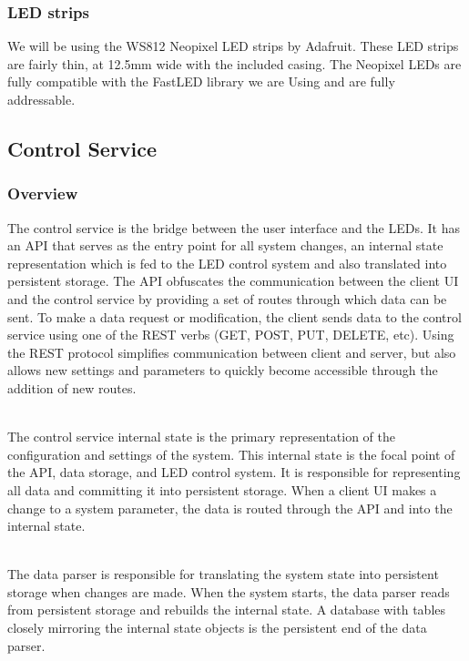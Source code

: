 \documentclass[onecolumn, draftclsnofoot,10pt, compsoc]{IEEEtran}
\begin{document}
			\subsubsection{LED strips}
			\noindent We will be using the WS812 Neopixel LED strips by Adafruit. These LED
			strips are fairly thin, at 12.5mm wide with the included casing. The
			Neopixel LEDs are fully compatible with the FastLED library we are Using
			and are fully addressable\cite{neo}.

		\subsection{Control Service}
			\subsubsection{Overview}
			The control service is the bridge between the user interface and the LEDs.
			It has an API that serves as the entry point for all system changes, an internal state representation which is fed to the LED control system and also translated into persistent storage.
			The API obfuscates the communication between the client UI and the control service by providing a set of routes through which data can be sent.
			To make a data request or modification, the client sends data to the control service using one of the REST verbs (GET, POST, PUT, DELETE, etc).
			Using the REST protocol simplifies communication between client and server, but also allows new settings and parameters to quickly become accessible through the addition of new routes.

			\noindent \\The control service internal state is the primary representation of the configuration and settings of the system.
			This internal state is the focal point of the API, data storage, and LED control system.
			It is responsible for representing all data and committing it into persistent storage.
			When a client UI makes a change to a system parameter, the data is routed through the API and into the internal state.

			\noindent \\The data parser is responsible for translating the system state into persistent storage when changes are made.
			When the system starts, the data parser reads from persistent storage and rebuilds the internal state.
			A database with tables closely mirroring the internal state objects is the persistent end of the data parser.
\end{document}
